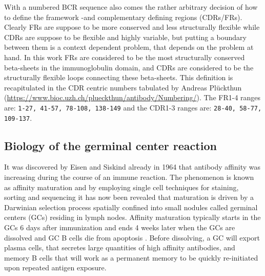 With a numbered BCR sequence also comes the rather arbitrary decision of how to define the framework -and complementary defining regions (CDRs/FRs).
Clearly FRs are suppose to be more conserved and less structurally flexible while CDRs are suppose to be flexible and highly variable, but putting a boundary between them is a context dependent problem, that depends on the problem at hand.
In this work FRs are considered to be the most structurally conserved beta-sheets in the immunoglobulin domain, and CDRs are considered to be the structurally flexible loops connecting these beta-sheets.
This definition is recapitulated in the CDR centric numbers tabulated by Andreas Pl{\"u}ckthun (\url{https://www.bioc.uzh.ch/plueckthun/antibody/Numbering/}).
The FR1-4 ranges are: \texttt{1-27, 41-57, 78-108, 138-149} and the CDR1-3 ranges are: \texttt{28-40, 58-77, 109-137}.






\subsection{Biology of the germinal center reaction}
It was discovered by Eisen and Siskind already in 1964 \cite{eisen1964variations} that antibody affinity was increasing during the course of an immune reaction.
The phenomenon is known as affinity maturation and by employing single cell techniques for staining, sorting and sequencing it has now been revealed that maturation is driven by a Darwinian selection process spatially confined into small nodules called germinal centers (GCs) residing in lymph nodes.
Affinity maturation typically starts in the GCs 6 days after immunization and ends 4 weeks later when the GCs are dissolved and GC B cells die from apoptosis \cite{victora2012germinal}.
Before dissolving, a GC will export plasma cells, that secretes large quantities of high affinity antibodies, and memory B cells that will work as a permanent memory to be quickly re-initiated upon repeated antigen exposure.

